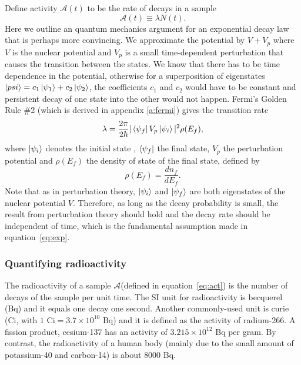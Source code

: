 \documentclass[preprint,aip,pra]{revtex4-1}
\begin{document}
        Define activity $\mathcal{A}(t)$ to be the rate of decays in a sample
        \begin{equation} \label{eq:act}
            \mathcal{A}(t)\equiv \lambda N(t).
        \end{equation}
        Here we outline an quantum mechanics argument for an exponential decay law that is perhaps more
        convincing.
        We approximate the potential by $V+V_p$ where $V$ is the nuclear potential and $V_p$ is a small
        time-dependent perturbation that causes the transition between the states. We know that there has
        to be time dependence in the potential, otherwise for a superposition of eigenstates
        $\ket{psi}=c_1\ket{\psi_1} + c_2\ket{\psi_2}$, the coefficients $c_1$ and $c_2$ would 
        have to be constant and
        persistent decay of one state into the other would not happen.
        Fermi's Golden Rule \#2 (which is derived in appendix \ref{a:fermi})
        gives the transition rate
        \begin{equation}
            \lambda = \frac{2\pi}{2\hbar}|\bra{\psi_f}V_p\ket{\psi_i}|^2\rho(E_f),
        \end{equation}
        where $\ket{\psi_i}$ denotes the initial state , $\bra{\psi_f}$ the final state, $V_p$ the perturbation
        potential and $\rho(E_f)$ the density of state of the final state, defined by
        \begin{equation}
            \rho(E_f) = \frac{dn_f}{dE_f}.
        \end{equation}
        Note that as in perturbation theory, $\ket{\psi_i}$ and
        $\ket{\psi_f}$ are both eigenstates of the nuclear potential $V$. Therefore, as long as
        the decay probability is small, the result from perturbation theory should hold and the
        decay rate should be independent of time, which is the fundamental assumption made in
        equation~\ref{eq:exp}.

        \subsubsection{Quantifying radioactivity}
        The radioactivity of a sample $\mathcal{A}$(defined in equation~\ref{eq:act}) 
        is the number of decays of the sample per unit time. The SI
        unit for radioactivity is becquerel (Bq) and it equals one decay one second. Another commonly-used
        unit is curie (Ci, with $1\text{ Ci}=3.7\times 10^{10}\text{ Bq}$) and it is defined as
        the activity of radium-266. A fission product, cesium-137 has an activity of $3.215\times 10^{12}$ Bq
        per gram. By contrast, the radioactivity of a human body (mainly due to the small amount of 
        potassium-40 and carbon-14) is about $8000$ Bq.
\end{document}
